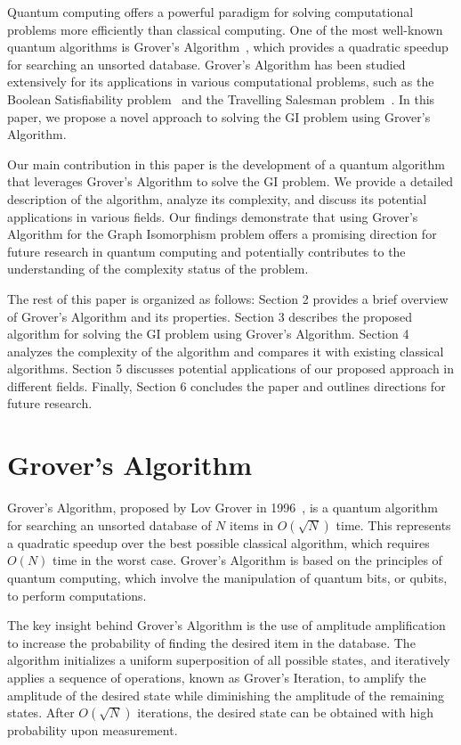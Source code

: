 Quantum computing offers a powerful paradigm for solving computational problems more efficiently than classical computing. One of the most well-known quantum algorithms is Grover's Algorithm~\cite{grover}, which provides a quadratic speedup for searching an unsorted database. Grover's Algorithm has been studied extensively for its applications in various computational problems, such as the Boolean Satisfiability problem~\cite{boolean-satisfiability} and the Travelling Salesman problem~\cite{travelling-salesman}. In this paper, we propose a novel approach to solving the GI problem using Grover's Algorithm.

Our main contribution in this paper is the development of a quantum algorithm that leverages Grover's Algorithm to solve the GI problem. We provide a detailed description of the algorithm, analyze its complexity, and discuss its potential applications in various fields. Our findings demonstrate that using Grover's Algorithm for the Graph Isomorphism problem offers a promising direction for future research in quantum computing and potentially contributes to the understanding of the complexity status of the problem.

The rest of this paper is organized as follows: Section 2 provides a brief overview of Grover's Algorithm and its properties. Section 3 describes the proposed algorithm for solving the GI problem using Grover's Algorithm. Section 4 analyzes the complexity of the algorithm and compares it with existing classical algorithms. Section 5 discusses potential applications of our proposed approach in different fields. Finally, Section 6 concludes the paper and outlines directions for future research.

\section{Grover's Algorithm}
Grover's Algorithm, proposed by Lov Grover in 1996~\cite{grover}, is a quantum algorithm for searching an unsorted database of $N$ items in $O(\sqrt{N})$ time. This represents a quadratic speedup over the best possible classical algorithm, which requires $O(N)$ time in the worst case. Grover's Algorithm is based on the principles of quantum computing, which involve the manipulation of quantum bits, or qubits, to perform computations.

The key insight behind Grover's Algorithm is the use of amplitude amplification to increase the probability of finding the desired item in the database. The algorithm initializes a uniform superposition of all possible states, and iteratively applies a sequence of operations, known as Grover's Iteration, to amplify the amplitude of the desired state while diminishing the amplitude of the remaining states. After $O(\sqrt{N})$ iterations, the desired state can be obtained with high probability upon measurement.

